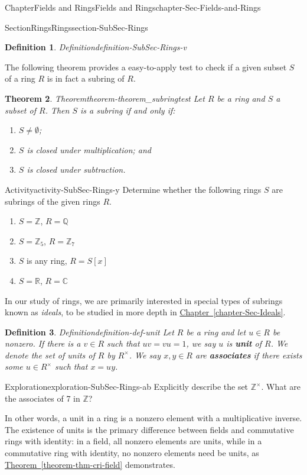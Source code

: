 \documentclass[oneside,10pt,]{book}
\newcommand{\xreffont}{\relax}
\newcommand{\terminology}[1]{\textbf{#1}}
\numberwithin{equation}{section}
\def\C{{\mathbb C}}
\def\Z{{\mathbb Z}}
\def\Q{{\mathbb Q}}
\def\R{{\mathbb R}}
\newtheorem{theorem}{Theorem}[section]
\newtheorem{definition}[theorem]{Definition}
\begin{document}
\begin{chapterptx}{Chapter}{Fields and Rings}{}{Fields and Rings}{}{}{chapter-Sec-Fields-and-Rings}
\begin{sectionptx}{Section}{Rings}{}{Rings}{}{}{section-SubSec-Rings}
\begin{definition}{Definition}{}{definition-SubSec-Rings-v}
\end{definition}
The following theorem provides a easy-to-apply test to check if a given subset \(S\) of a ring \(R\) is in fact a subring of \(R\).%
\begin{theorem}{Theorem}{}{}{theorem-theorem_subringtest}%
%
Let \(R\) be a ring and \(S\) a subset of \(R\). Then \(S\) is a subring if and only if:%
\begin{enumerate}
\item{}\(S\ne \emptyset\);%
\item{}\(S\) is closed under multiplication; and%
\item{}\(S\) is closed under subtraction.%
\end{enumerate}
%
\end{theorem}
\begin{activity}{Activity}{}{activity-SubSec-Rings-y}%
Determine whether the following rings \(S\) are subrings of the given rings \(R\).%
\begin{enumerate}
\item{}\(S = \Z\), \(R = \Q\)%
\item{}\(S = \Z_{5}\), \(R = \Z_{7}\)%
\item{}\(S\) is any ring, \(R = S[x]\)%
\item{}\(S = \R\), \(R = \C\)%
\end{enumerate}
%
\end{activity}%
In our study of rings, we are primarily interested in special types of subrings known as \emph{ideals}, to be studied in more depth in \hyperref[chapter-Sec-Ideals]{Chapter~{\xreffont\ref{chapter-Sec-Ideals}}}.%
\begin{definition}{Definition}{}{definition-def-unit}%
%
%
Let \(R\) be a ring and let \(u\in R\) be nonzero. If there is a \(v\in R\) such that \(uv = vu = 1\), we say \(u\) is \terminology{unit} of \(R\). We denote the set of units of \(R\) by \(R^\times\). We say \(x,y\in R\) are \terminology{associates} if there exists some \(u\in R^\times\) such that \(x = uy\).%
\end{definition}
\begin{exploration}{Exploration}{}{exploration-SubSec-Rings-ab}%
Explicitly describe the set \(\Z^\times\). What are the associates of 7 in \(\Z\)?%
\end{exploration}%
In other words, a unit in a ring is a nonzero element with a multiplicative inverse. The existence of units is the primary difference between fields and commutative rings with identity: in a field, all nonzero elements are units, while in a commutative ring with identity, no nonzero elements need be units, as \hyperref[theorem-thm-cri-field]{Theorem~{\xreffont\ref{theorem-thm-cri-field}}} demonstrates.%

\end{sectionptx}
\end{chapterptx}
\end{document}
